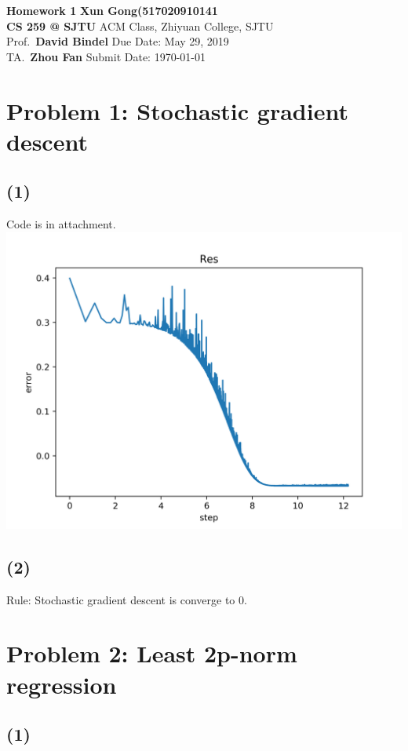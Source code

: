 \documentclass[a4paper]{article}
\begin{document}
\noindent
\large \textbf{Homework 1} \hfill \textbf{Xun Gong(517020910141} \\
\normalsize {\bf CS 259 @ SJTU} \hfill ACM Class, Zhiyuan College, SJTU\\
Prof.~{\bf David Bindel} \hfill Due Date: May 29, 2019\\
TA.~{\bf Zhou Fan} \hfill Submit Date: \today

\section*{Problem 1: Stochastic gradient descent}

\subsection*{(1)}

Code is in attachment. 
\includegraphics[scale=0.6]{hw.png}

\subsection*{(2)}

Rule: Stochastic gradient descent is converge to $0$.


\section*{Problem 2: Least 2p-norm regression}

\subsection*{(1)}
\end{document}
